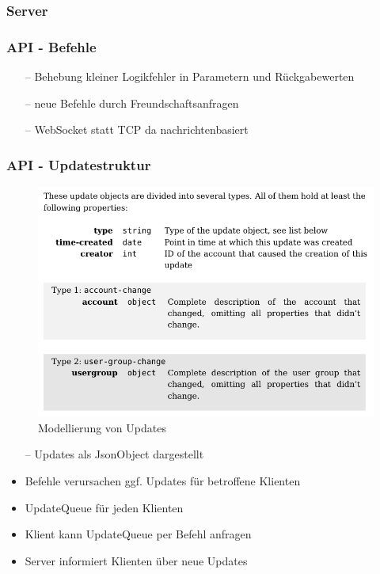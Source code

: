 \documentclass[aspectratio=1610]{beamer}
\begin{document}
	\begin{frame}[plain]
		\frametitle{Server}

	\end{frame}

	\begin{frame}[plain]
		\frametitle{API - Befehle}
			\begin{itemize}
				\item[--] Behebung kleiner Logikfehler in Parametern und Rückgabewerten
				\item[--] neue Befehle durch Freundschaftsanfragen
				\item[--] WebSocket statt TCP da nachrichtenbasiert
			\end{itemize}
		\end{frame}

		\begin{frame}[plain]
			\frametitle{API - Updatestruktur}
			\begin{minipage}{0.55\textwidth}
			\begin{figure}[h]
				\centering
				\includegraphics[width=1\textwidth]{images/Updates.png}
				\caption{Modellierung von Updates}
			\end{figure}
			\end{minipage}%
			\begin{minipage}{0.45\textwidth}
			\begin{itemize}
				\item[--] Updates als JsonObject dargestellt
				\item<2->[--] Befehle verursachen ggf. Updates für betroffene Klienten
				\item<3->[--] UpdateQueue für jeden Klienten
				\item<4->[--] Klient kann UpdateQueue per Befehl anfragen
				\item<5->[--] Server informiert Klienten über neue Updates
				
			\end{itemize}
			\end{minipage}
	\end{frame}
\end{document}

